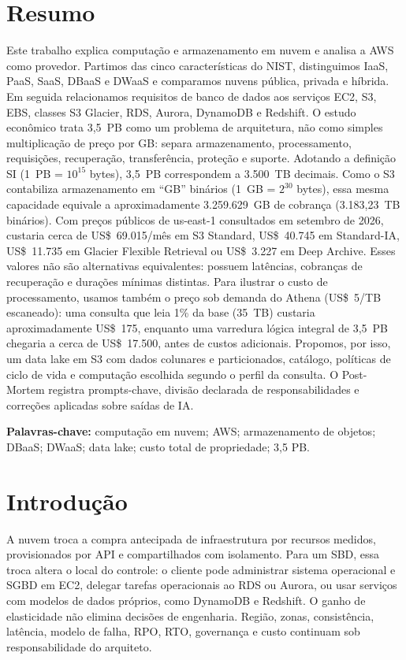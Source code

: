 \documentclass[11pt,a4paper]{article}
\begin{document}
\section*{Resumo}
Este trabalho explica computação e armazenamento em nuvem e analisa a AWS como provedor. Partimos
das cinco características do NIST, distinguimos IaaS, PaaS, SaaS, DBaaS e DWaaS e comparamos
nuvens pública, privada e híbrida. Em seguida relacionamos requisitos de banco de dados aos
serviços EC2, S3, EBS, classes S3 Glacier, RDS, Aurora, DynamoDB e Redshift. O estudo econômico
trata 3,5~PB como um problema de arquitetura, não como simples multiplicação de preço por GB:
separa armazenamento, processamento, requisições, recuperação, transferência, proteção e suporte.
Adotando a definição SI (1~PB = $10^{15}$ bytes), 3,5~PB correspondem a 3.500~TB decimais.
Como o S3 contabiliza armazenamento em ``GB'' binários (1~GB = $2^{30}$ bytes), essa mesma
capacidade equivale a aproximadamente 3.259.629~GB de cobrança (3.183,23~TB binários).
Com preços públicos de us-east-1 consultados em setembro de 2026, custaria cerca de
US\$~69.015/mês em S3 Standard, US\$~40.745 em Standard-IA, US\$~11.735 em Glacier Flexible
Retrieval ou US\$~3.227 em Deep Archive. Esses valores não são alternativas equivalentes: possuem latências,
cobranças de recuperação e durações mínimas distintas. Para ilustrar o custo de processamento, usamos também
o preço sob demanda do Athena (US\$~5/TB escaneado): uma consulta que leia 1\% da base (35~TB) custaria
aproximadamente US\$~175, enquanto uma varredura lógica integral de 3,5~PB chegaria a cerca de US\$~17.500,
antes de custos adicionais. Propomos, por isso, um data lake em S3 com dados colunares e particionados,
catálogo, políticas de ciclo de vida e computação escolhida segundo o perfil da consulta. O Post-Mortem
registra prompts-chave, divisão declarada de responsabilidades e correções aplicadas sobre saídas de IA.

\noindent\textbf{Palavras-chave:} computação em nuvem; AWS; armazenamento de objetos; DBaaS;
DWaaS; data lake; custo total de propriedade; 3,5 PB.
\clearpage


\section*{Introdução}
A nuvem troca a compra antecipada de infraestrutura por recursos medidos, provisionados por API e
compartilhados com isolamento. Para um SBD, essa troca altera o local do controle: o cliente pode
administrar sistema operacional e SGBD em EC2, delegar tarefas operacionais ao RDS ou Aurora, ou
usar serviços com modelos de dados próprios, como DynamoDB e Redshift. O ganho de elasticidade não
elimina decisões de engenharia. Região, zonas, consistência, latência, modelo de falha, RPO, RTO,
governança e custo continuam sob responsabilidade do arquiteto.
\end{document}
